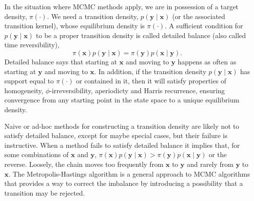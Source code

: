 \documentclass[12pt]{report}
\begin{document}
In the situation where MCMC methods apply, we are in possession of a target density, $\pi(\cdot)$. We need a transition density, $p(\boldsymbol{y} \mid \boldsymbol{x})$ (or the associated transition kernel), whose equilibrium density is $\pi(\cdot)$. A sufficient condition for $p(\boldsymbol{y} \mid \boldsymbol{x})$ to be a proper transition density is called detailed balance (also called time reversibility), 
\begin{equation}
\pi(\boldsymbol{x})p(\boldsymbol{y} \mid \boldsymbol{x}) = \pi(\boldsymbol{y})p(\boldsymbol{x} \mid \boldsymbol{y}).
\end{equation}
Detailed balance says that starting at $\boldsymbol{x}$ and moving to $\boldsymbol{y}$ happens as often as starting at $\boldsymbol{y}$ and moving to $\boldsymbol{x}$. In addition, if the transition density $p(\boldsymbol{y} \mid \boldsymbol{x})$ has support equal to $\pi(\cdot)$ or contained in it, then it will satisfy properties of homogeneity, $\phi$-irreversibility, aperiodicty and Harris recurrence, ensuring convergence from any starting point in the state space to a unique equilibrium density. 

Naive or ad-hoc methods for constructing a transition density are likely not to satisfy detailed balance, except for maybe special cases, but their failure is instructive. When a method fails to satisfy detailed balance it implies that, for some combinations of $\boldsymbol{x}$ and $\boldsymbol{y}$, $\pi(\boldsymbol{x})p(\boldsymbol{y} \mid \boldsymbol{x}) > \pi(\boldsymbol{y})p(\boldsymbol{x} \mid \boldsymbol{y})$ or the reverse. Loosely, the chain moves too frequently from $\boldsymbol{x}$ to $\boldsymbol{y}$ and rarely from $\boldsymbol{y}$ to $\boldsymbol{x}$. The Metropolis-Hastings algorithm is a general approach to MCMC algorithms that provides a way to correct the imbalance by introducing a possibility that a transition may be rejected.
\end{document}
